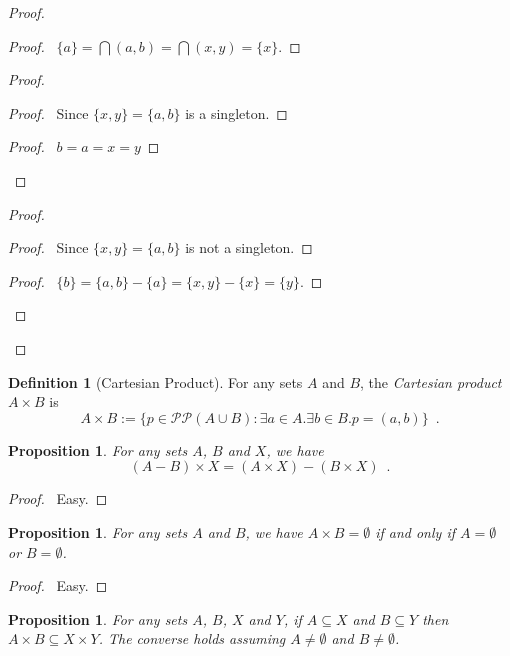 \documentclass{report}
\let\qed\relax
\newtheorem{prop}[ax]{Proposition}
\theoremstyle{definition}
\newtheorem{df}[ax]{Definition}
\begin{document}
\begin{proof}
\pf
{}
\begin{proof}
	\pf\ $\{a\} = \bigcap (a,b) = \bigcap (x,y) = \{x\}$.
\end{proof}
\begin{proof}
	\begin{proof}
		\pf\ Since $\{x,y\} = \{a,b\}$ is a singleton.
	\end{proof}
	\begin{proof}
		\pf\ $b = a = x = y$
	\end{proof}
\end{proof}
\begin{proof}
	\begin{proof}
		\pf\ Since $\{x,y\} = \{a,b\}$ is not a singleton.
	\end{proof}
	\begin{proof}
		\pf\ $\{b\} = \{a,b\} - \{a\} = \{x,y\} - \{x\} = \{y\}$.
	\end{proof}
\end{proof}
\qed
\end{proof}

\begin{df}[Cartesian Product]
For any sets $A$ and $B$, the \emph{Cartesian product} $A \times B$ is
\[ A \times B := \{ p \in \mathcal{P} \mathcal{P} (A \cup B) : \exists a \in A. \exists b \in B. p = (a,b) \} \enspace . \]
\end{df}

\begin{prop}
For any sets $A$, $B$ and $X$, we have
\[ (A - B) \times X = (A \times X) - (B \times X) \enspace . \]
\end{prop}

\begin{proof}
\pf\ Easy. \qed
\end{proof}

\begin{prop}
For any sets $A$ and $B$, we have $A \times B = \emptyset$ if and only if $A = \emptyset$ or $B = \emptyset$.
\end{prop}

\begin{proof}
\pf\ Easy. \qed
\end{proof}

\begin{prop}
For any sets $A$, $B$, $X$ and $Y$, if $A \subseteq X$ and $B \subseteq Y$ then $A \times B \subseteq X \times Y$. The converse holds assuming $A \neq \emptyset$ and $B \neq \emptyset$.
\end{prop}
\end{document}
